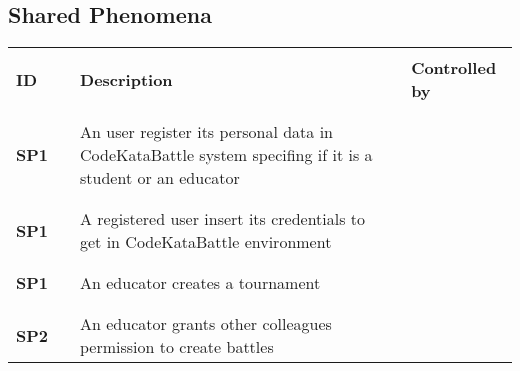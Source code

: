 \subsection{Shared Phenomena}

\renewcommand{\arraystretch}{0.5}
\begin{longtable}[H]{l l p{8.5cm} l l}
    \hline
                  &        &                                                                                                          &        &                        \\
    \textbf{ID}   & \vline & \textbf{Description}                                                                                     & \vline & \textbf{Controlled by} \\
                  &        &                                                                                                          &        &                        \\\hline & & & & \\
    \textbf{SP1}  & \vline & An user register its personal data in CodeKataBattle system specifing if it is a student or an educator  & \vline &                        \\
                  &        &                                                                                                          &        &                        \\\hline & & & & \\
    \textbf{SP1}  & \vline & A registered user insert its credentials to get in CodeKataBattle environment                            & \vline &                        \\
                  &        &                                                                                                          &        &                        \\\hline & & & & \\
    \textbf{SP1}  & \vline & An educator creates a tournament                                                                         & \vline &                        \\
                  &        &                                                                                                          &        &                        \\\hline & & & & \\
    \textbf{SP2}  & \vline & An educator grants other colleagues permission to create battles                                         & \vline &                        \\

\end{longtable}
